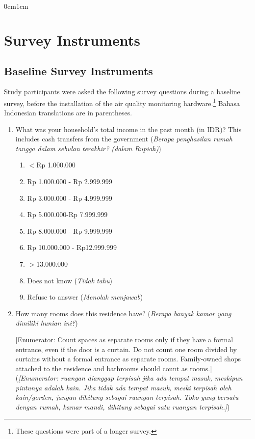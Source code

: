 \documentclass[9pt,twoside,lineno]{pnas-new}
\begin{document}
\SItext
\begin{adjustwidth}{0cm}{1cm} 
\section*{Survey Instruments}

\subsection*{Baseline Survey Instruments}

Study participants were asked the following survey questions during a baseline survey, before the installation of the air quality monitoring hardware.\footnote{These questions were part of a longer survey.} Bahasa Indonesian translations are in parentheses.

\begin{enumerate}
\item What was your household's total income in the past month (in IDR)? This includes cash transfers from the government (\textit{Berapa penghasilan rumah tangga dalam sebulan terakhir? (dalam Rupiah)})
\begin{enumerate}
    \item $<$Rp 1.000.000
    \item Rp 1.000.000 - Rp 2.999.999
    \item Rp 3.000.000 - Rp 4.999.999
    \item Rp 5.000.000-Rp 7.999.999
    \item Rp 8.000.000 - Rp 9.999.999
    \item Rp 10.000.000 - Rp12.999.999
    \item $>$13.000.000
        \item Does not know (\textit{Tidak tahu})
        \item Refuse to answer (\textit{Menolak menjawab})
\end{enumerate}
\item How many rooms does this residence have? (\textit{Berapa banyak kamar yang dimiliki hunian ini?})

[Enumerator: Count spaces as separate rooms only if they have a formal entrance, even if the door is a curtain. Do not count one room divided by curtains without a formal entrance as separate rooms. Family-owned shops attached to the residence and bathrooms should count as rooms.] \\ 
(\textit{[Enumerator: ruangan dianggap terpisah jika ada tempat masuk, meskipun pintunya adalah kain. Jika tidak ada tempat masuk, meski terpisah oleh kain/gorden, jangan dihitung sebagai ruangan terpisah. Toko yang bersatu dengan rumah, kamar mandi, dihitung sebagai satu ruangan terpisah.]})


\end{enumerate}
\end{adjustwidth}
\end{document}
